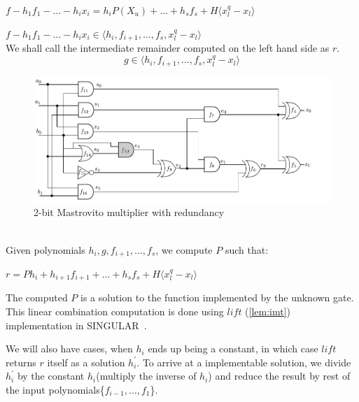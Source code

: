 $f - h_1f_1 -\dots-h_ix_i = h_iP(X_u)+\dots+h_sf_s+H\langle x_l^q-x_l\rangle$

$f - h_1f_1 -\dots-h_ix_i \in \langle h_i,f_{i+1},\dots,f_s, x_l^q-x_l\rangle$\\
We shall call the intermediate remainder computed on the left hand side as $r$.
\begin{equation}
g \in \langle h_i,f_{i+1},\dots,f_s, x_l^q-x_l\rangle
\end{equation}
\begin{figure}[hbt]
	\begin{center}
	\includegraphics[scale = 0.80]{mas_c}
	\end{center}
	\vspace{-2ex}
	\caption{2-bit Mastrovito multiplier with redundancy}
	\label{mas_c}
	\vspace{-1ex}
\end{figure}\\
Given polynomials $h_i, g, f_{i+1},\dots,f_s$, we compute $P$ such that:

 $r = Ph_i+h_{i+1}f_{i+1}+\dots+h_sf_s+H\langle x_l^q-x_l\rangle$

The computed $P$ is a solution to the function implemented by the unknown gate. This linear combination computation is done using $lift$ (\autoref{lem:imt}) implementation in SINGULAR~\cite{DGPS_410}.

We will also have cases, when $h_i$ ends up being a constant, in which case $lift$ returns $r$ itself as a solution $h_i^{'}$. To arrive at a implementable solution, we divide $h_i^{'}$ by the constant $h_i$(multiply the inverse of $h_i$) and reduce the result by rest of the input polynomials\{$f_{i-1},\dots,f_1$\}. 

